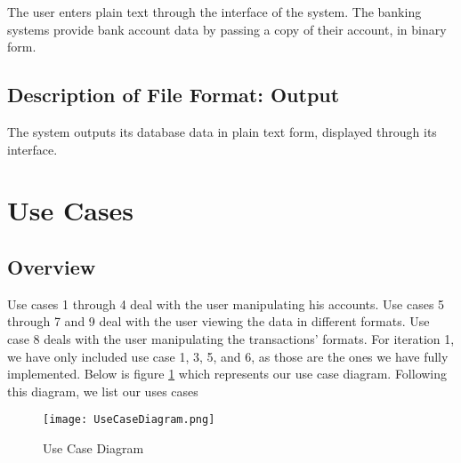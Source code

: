 \documentclass[11pt]{article}
\newcounter{use case ID}
\begin{document}
The user enters plain text through the interface of the system. The banking systems provide bank account data by passing a copy of their account, in binary form.

\subsection{Description of File Format: Output}

The system outputs its database data in plain text form, displayed through its interface.

\section{Use Cases}
\subsection{Overview}
Use cases 1 through 4 deal with the user manipulating his accounts. Use cases 5 through 7 and 9 deal with the user viewing the data in different formats. Use case 8 deals with the user manipulating the transactions' formats. For iteration 1, we have only included use case 1, 3, 5, and 6, as those are the ones we have fully implemented. Below is figure \ref{fig:use-case-diagram} which represents our use case diagram. Following this diagram, we list our uses cases

\begin{figure}[htbp]
\texttt{[image: UseCaseDiagram.png]}
\caption{Use Case Diagram}
\label{fig:use-case-diagram}
\end{figure}
\end{document}
